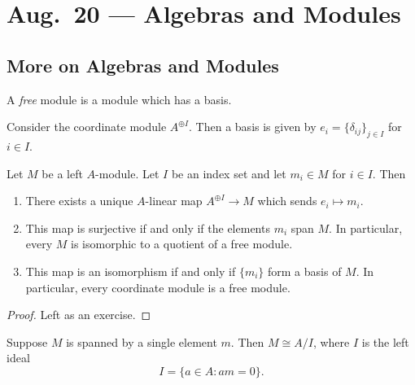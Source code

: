 \chapter{Aug.~20 --- Algebras and Modules}

\section{More on Algebras and Modules}
\begin{definition}
  A \emph{free} module is a module
  which has a basis.
\end{definition}

\begin{example}
  Consider the coordinate module
  $A^{\oplus I}$. Then a basis is given
  by $e_i = \{\delta_{ij}\}_{j \in I}$
    for $i \in I$.
\end{example}

\begin{prop}
  Let $M$ be a left $A$-module. Let
  $I$ be an index set and let $m_i \in M$
  for $i \in I$. Then
  \begin{enumerate}
    \item There exists a unique $A$-linear
      map $A^{\oplus I} \to M$ which sends
      $e_i \mapsto m_i$.
    \item This map is surjective if and only
      if the elements $m_i$ span $M$.
      In particular, every $M$ is isomorphic
      to a quotient of a free module.
    \item This map is an isomorphism
      if and only if $\{m_i\}$
      form a basis of $M$. In particular,
      every coordinate module is a
      free module.
  \end{enumerate}
\end{prop}

\begin{proof}
  Left as an exercise.
\end{proof}

\begin{example}
  Suppose $M$ is spanned by a single
  element $m$. Then $M \cong A / I$,
  where $I$ is the left ideal
  \[
    I = \{a \in A : am = 0\}.
  \]
\end{example}

